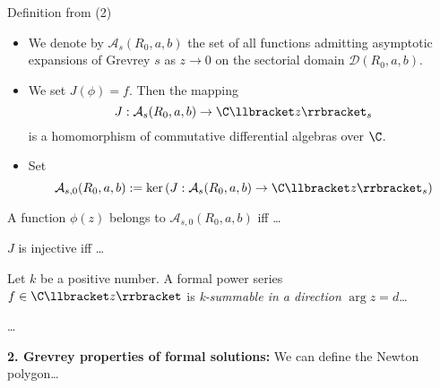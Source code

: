 {  \begin{frame}{Definition from \cite{zbMATH00060600} (2)}
    \begin{itemize}
      \item We denote by $\mathcal{A}_s(R_0,a,b)$ the set of all functions
      admitting asymptotic expansions of Grevrey $s$ as $z\to 0$ on the
      sectorial domain $\mathcal{D}(R_0,a,b)$.
      \item We set $J(\phi)=f$. Then the mapping
      \[
      J: \mathcal{A}_s(R_0,a,b) \to \C\llbracket z\rrbracket_s
      \]
      is a homomorphism of commutative differential algebras over $\C$.
      \item Set
      \[
      \mathcal{A}_{s,0}(R_0,a,b):=
      \ker\left(J: \mathcal{A}_s(R_0,a,b) \to \C\llbracket z\rrbracket_s\right)
      \]
    \end{itemize}
    \begin{lem}[1.3]
      A function $\phi(z)$ belongs to $\mathcal{A}_{s,0}(R_0,a,b)$ iff \dots
    \end{lem}
    \begin{cor}[1.4]
      $J$ is injective iff \dots
    \end{cor}
    \begin{defn}[1.5]
      Let $k$ be a positive number. A formal power series $f\in\C\llbracket
      z\rrbracket$ is \emph{k-summable in a direction} $\arg z=d$\dots 
    \end{defn}

    \dots

    \textbf{2. Grevrey properties of formal solutions:} We can define the
    Newton polygon\dots 
  \end{frame}
}

